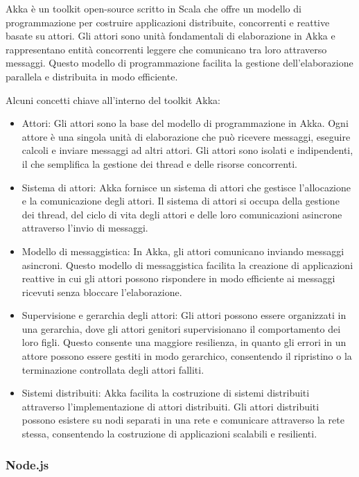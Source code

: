 \documentclass[12pt]{article}
\begin{document}
Akka è un toolkit open-source scritto in Scala che offre un modello di programmazione per costruire applicazioni distribuite, concorrenti e reattive basate su attori. Gli attori sono unità fondamentali di elaborazione in Akka e rappresentano entità concorrenti leggere che comunicano tra loro attraverso messaggi. Questo modello di programmazione facilita la gestione dell'elaborazione parallela e distribuita in modo efficiente.

Alcuni concetti chiave all'interno del toolkit Akka:

\begin{itemize}
    \item Attori: Gli attori sono la base del modello di programmazione in Akka. Ogni attore è una singola unità di elaborazione che può ricevere messaggi, eseguire calcoli e inviare messaggi ad altri attori. Gli attori sono isolati e indipendenti, il che semplifica la gestione dei thread e delle risorse concorrenti.
    \item Sistema di attori: Akka fornisce un sistema di attori che gestisce l'allocazione e la comunicazione degli attori. Il sistema di attori si occupa della gestione dei thread, del ciclo di vita degli attori e delle loro comunicazioni asincrone attraverso l'invio di messaggi.
    \item Modello di messaggistica: In Akka, gli attori comunicano inviando messaggi asincroni. Questo modello di messaggistica facilita la creazione di applicazioni reattive in cui gli attori possono rispondere in modo efficiente ai messaggi ricevuti senza bloccare l'elaborazione.
    \item Supervisione e gerarchia degli attori: Gli attori possono essere organizzati in una gerarchia, dove gli attori genitori supervisionano il comportamento dei loro figli. Questo consente una maggiore resilienza, in quanto gli errori in un attore possono essere gestiti in modo gerarchico, consentendo il ripristino o la terminazione controllata degli attori falliti.
    \item Sistemi distribuiti: Akka facilita la costruzione di sistemi distribuiti attraverso l'implementazione di attori distribuiti. Gli attori distribuiti possono esistere su nodi separati in una rete e comunicare attraverso la rete stessa, consentendo la costruzione di applicazioni scalabili e resilienti.
\end{itemize}

\subsubsection{Node.js}
\end{document}
